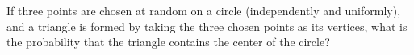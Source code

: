 If three points are chosen at random on a circle (independently and uniformly), and a triangle is formed by taking the three chosen points as its vertices, what is the probability that the triangle contains the center of the circle?
